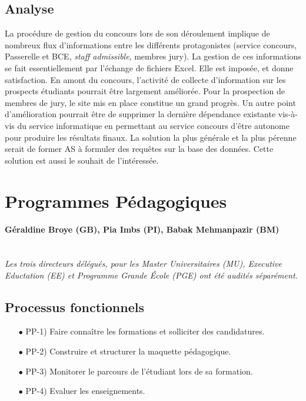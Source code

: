 \documentclass{book}
\begin{document}
\subsection{Analyse}

La procédure de gestion du concours lors de son déroulement
implique de nombreux flux d'informations entre les différents
protagonistes (service concours, Passerelle et BCE, \textit{staff 
admissible}, membres jury). La gestion de ces informations se fait
essentiellement par l'échange de fichiers Excel. Elle est imposée,
et donne satisfaction.
En amont du concours, l'activité de collecte d'information sur les
prospects étudiants pourrait être largement améliorée. Pour la
prospection de membres de jury, le site mis en place constitue un
grand progrès.
Un autre point d'amélioration pourrait être de supprimer la dernière
dépendance existante vis-à-vis du service informatique en permettant
au service concours d'être autonome pour produire les résultats finaux.
La solution la plus générale et la plus pérenne serait de former AS à 
formuler des requêtes sur la base des données. Cette solution est aussi
le souhait de l'intéressée.



\section{Programmes Pédagogiques}
\paragraph{
Géraldine Broye (GB), %
Pia Imbs (PI),
Babak Mehmanpazir (BM)} 
~\\

\textit{Les trois directeurs délégués, pour les Master Universitaires (MU), 
Executive Eductation (EE) et Programme Grande \'Ecole (PGE) ont été audités 
séparément.}

\subsection{Processus fonctionnels}
\label{sc:pp-process}

\begin{itemize}
\item[$\bullet$] PP-1) Faire connaître les formations et solliciter des candidatures.
\item[$\bullet$] PP-2) Construire et structurer la maquette pédagogique.
\item[$\bullet$] PP-3) Monitorer le parcours de l'étudiant lors de sa formation.
\item[$\bullet$] PP-4) Evaluer les enseignements. 
\end{itemize}
\bigskip
\end{document}
